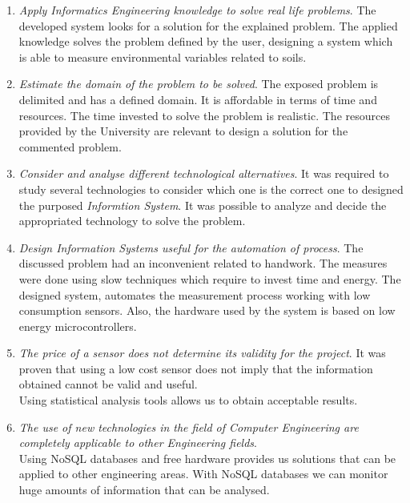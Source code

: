 \begin{enumerate}

\item \textit{Apply Informatics Engineering knowledge to solve real life problems}. The developed system looks for a solution for the explained problem. The applied knowledge solves the problem defined by the user, designing a system which is able to measure environmental variables related to soils.

\item \textit{Estimate the domain of the problem to be solved}. The exposed problem is delimited and has a defined domain. It is affordable in terms of time and resources. The time invested to solve the problem is realistic. The resources provided by the University are relevant to design a solution for the commented problem.

\item \textit{Consider and analyse different technological alternatives}. It was required to study several technologies to consider which one is the correct one to designed the purposed \textit{Informtion System}. It was possible to analyze and decide the appropriated technology to solve the problem.

\item \textit{Design Information Systems useful for the automation of process}. The discussed problem had an inconvenient related to handwork. The measures were done using slow techniques which require to invest time and energy. The designed system, automates the measurement process working with low consumption sensors. Also, the hardware used by the system is based on low energy microcontrollers.

\item \textit{The price of a sensor does not determine its validity for the project}. It was proven that using a low cost sensor does not imply that the information obtained cannot be valid and useful.\\

Using statistical analysis tools allows us to obtain acceptable results.

\item \textit{The use of new technologies in the field of Computer Engineering are completely applicable to other Engineering fields}.\\

Using NoSQL databases and free hardware provides us solutions that can be applied to other engineering areas. With NoSQL databases we can monitor huge amounts of information that can be analysed.\\


\end{enumerate}
